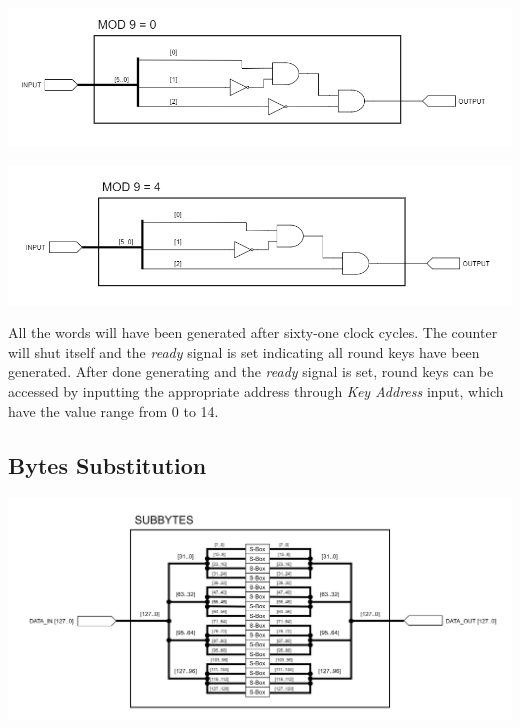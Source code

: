 \documentclass[a4paper, 10pt]{article}
\newenvironment{Figure}
    {\par\medskip\noindent\minipage{\linewidth}}
    {\endminipage\par\medskip}
\begin{document}
\begin{multicols}{2}
            \noindent
            \begin{Figure}
                \centering
                \includegraphics[width=\linewidth]{Mod9Eq0.png}
                \label{fig:mod9eq0}
            \end{Figure}

            \noindent
            \begin{Figure}
                \centering
                \includegraphics[width=\linewidth]{Mod9Eq4.png}
                \label{fig:mod9eq4}
            \end{Figure}

            All the words will have been generated after sixty-one clock cycles. The counter will shut itself and the \textit{ready} signal is set indicating all round keys have been generated. After done generating and the \textit{ready} signal is set, round keys can be accessed by inputting the appropriate address through \textit{Key Address} input, which have the value range from 0 to 14.

            \subsection{Bytes Substitution}

            \noindent
            \begin{Figure}
                \centering
                \includegraphics[width=\linewidth]{SubBytes.png}
                \label{fig:subbytes}
            \end{Figure}


\end{multicols}
\end{document}
